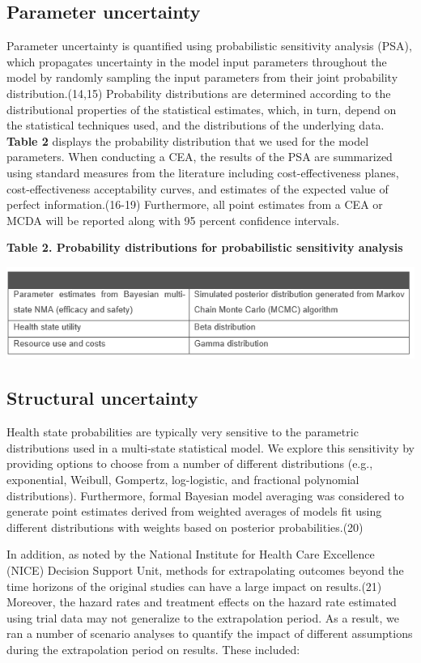 \documentclass[11pt,final,fleqn]{article}\usepackage[]{graphicx}\usepackage[]{color}
\theoremstyle{plain}
\begin{document}
{\subsection{Parameter uncertainty}

Parameter uncertainty is quantified using probabilistic sensitivity analysis (PSA), which propagates uncertainty in the model input parameters throughout the model by randomly sampling the input parameters from their joint probability distribution.(14,15) Probability distributions are determined according to the distributional properties of the statistical estimates, which, in turn, depend on the statistical techniques used, and the distributions of the underlying data. \textbf{Table 2} displays the probability distribution that we used for the model parameters. When conducting a CEA, the results of the PSA are summarized using standard measures from the literature including cost-effectiveness planes, cost-effectiveness acceptability curves, and estimates of the expected value of perfect information.(16-19) Furthermore, all point estimates from a CEA or MCDA will be reported along with 95 percent confidence intervals. 

\textbf{Table 2. Probability distributions for probabilistic sensitivity analysis } 

\includegraphics[scale=1]{Table 2.PNG} 

\subsection{Structural uncertainty}

Health state probabilities are typically very sensitive to the parametric distributions used in a multi-state statistical model. We explore this sensitivity by providing options to choose from a number of different distributions (e.g., exponential, Weibull, Gompertz, log-logistic, and fractional polynomial distributions). Furthermore, formal Bayesian model averaging was considered to generate point estimates derived from weighted averages of models fit using different distributions with weights based on posterior probabilities.(20)

In addition, as noted by the National Institute for Health Care Excellence (NICE) Decision Support Unit, methods for extrapolating outcomes beyond the time horizons of the original studies can have a large impact on results.(21) Moreover, the hazard rates and treatment effects on the hazard rate estimated using trial data may not generalize to the extrapolation period. As a result, we ran a number of scenario analyses to quantify the impact of different assumptions during the extrapolation period on results. These included: 

}
\end{document}
